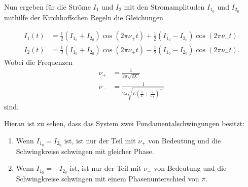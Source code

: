 Nun ergeben für die Ströme $I_1$ und $I_2$ mit den Stromamplituden $I_{1_0}$ und $I_{2_0}$ mithilfe der Kirchhoffschen Regeln die Gleichungen

\begin{align}
    \label{eq:strom}
    I_1(t) &= \frac{1}{2} (I_{1_0} + I_{2_0})\cos(2 \pi \nu _+ t) + \frac{1}{2} (I_{1_0} - I_{2_0})\cos(2 \pi \nu _- t) \\
    I_2(t) &= \frac{1}{2} (I_{1_0} + I_{2_0})\cos(2 \pi \nu _+ t) - \frac{1}{2} (I_{1_0} - I_{2_0})\cos(2 \pi \nu _- t).
\end{align}
Wobei die Frequenzen
\begin{align}
    \label{eq:frequenz+}
    \nu _+ &= \frac{1}{2 \pi \sqrt{L C}} \\
    \label{eq:frequenz-}
    \nu _- &= \frac{1}{2 \pi \sqrt{L \left( \frac{1}{C} + \frac{2}{C_k} \right)^{-1}}}
\end{align}
sind.\cite{V355}

Hieran ist zu sehen, dass das System zwei Fundamentalschwingungen besitzt:
\begin{enumerate}
\item Wenn $I_{1_0} = I_{2_0}$ ist, ist nur der Teil mit $\nu _+$ von Bedeutung und die Schwingkreise schwingen mit gleicher Phase.
\item Wenn $I_{1_0} = - I_{2_0}$ ist, ist nur der Teil mit $\nu _-$ von Bedeutung und die Schwingkreise schwingen mit einem Phasenunterschied von $\pi$.
\end{enumerate}

